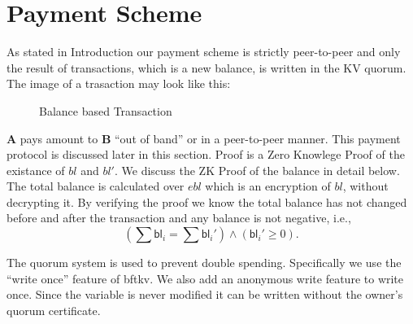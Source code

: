 \documentclass[10pt,fleqn]{article}
\begin{document}
\section{Payment Scheme}
As stated in Introduction our payment scheme is strictly peer-to-peer and only the result of transactions, which is a new balance, is written in the KV quorum. The image of a trasaction may look like this:
\begin{figure}[H]
\begin{center}
\end{center}
\caption{Balance based Transaction}
\end{figure}

\textbf{A} pays \textsf{amount} to \textbf{B} ``out of band'' or in a peer-to-peer manner. This payment protocol is discussed later in this section. \textsf{Proof} is a Zero Knowlege Proof of the existance of $bl$ and $bl'$. We discuss the ZK Proof of the balance in detail below. The total balance is calculated over $ebl$ which is an encryption of $bl$, without decrypting it. By verifying the proof we know the total balance has not changed before and after the transaction and any balance is not negative, i.e.,
\[
(\sum{\textsf{bl}_i} = \sum{\textsf{bl}_i'} ) \wedge (\textsf{bl}_i' \ge 0).
\]

The quorum system is used to prevent double spending. Specifically we use the ``write once'' feature of \textsf{bftkv}. We also add an anonymous write feature to write once. Since the variable is never modified it can be written without the owner's quorum certificate.
\end{document}
